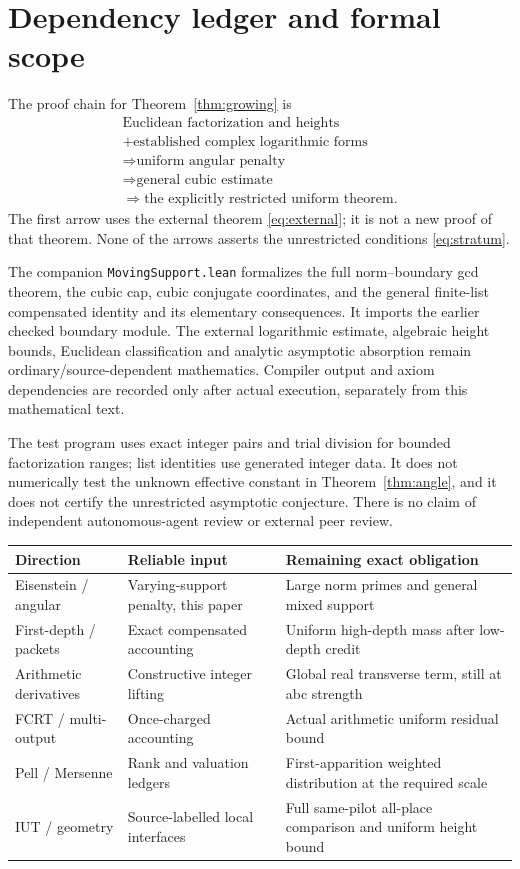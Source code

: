 \documentclass[11pt]{amsart}
\theoremstyle{definition}\newtheorem{definition}[theorem]{Definition}
\theoremstyle{remark}\newtheorem{remark}[theorem]{Remark}
\begin{document}
\section{Dependency ledger and formal scope}
The proof chain for Theorem~\ref{thm:growing} is
\[
 \begin{gathered}
 \text{Euclidean factorization and heights}\\
 +\text{established complex logarithmic forms}\\
 \Longrightarrow\text{uniform angular penalty}\\
 \Longrightarrow\text{general cubic estimate}\\
 \Longrightarrow\text{the explicitly restricted uniform theorem}.
 \end{gathered}
\]
The first arrow uses the external theorem \eqref{eq:external}; it is not a new proof of that theorem. None of the arrows asserts the unrestricted conditions \eqref{eq:stratum}.

The companion \texttt{MovingSupport.lean} formalizes the full norm--boundary gcd theorem, the cubic cap, cubic conjugate coordinates, and the general finite-list compensated identity and its elementary consequences. It imports the earlier checked boundary module. The external logarithmic estimate, algebraic height bounds, Euclidean classification and analytic asymptotic absorption remain ordinary/source-dependent mathematics. Compiler output and axiom dependencies are recorded only after actual execution, separately from this mathematical text.

The test program uses exact integer pairs and trial division for bounded factorization ranges; list identities use generated integer data. It does not numerically test the unknown effective constant in Theorem~\ref{thm:angle}, and it does not certify the unrestricted asymptotic conjecture. There is no claim of independent autonomous-agent review or external peer review.

\begin{center}\small
\begin{tabular}{p{}p{}p{}}
\toprule
Direction & Reliable input & Remaining exact obligation\\\midrule
Eisenstein / angular & Varying-support penalty, this paper & Large norm primes and general mixed support\\
First-depth / packets & Exact compensated accounting & Uniform high-depth mass after low-depth credit\\
Arithmetic derivatives & Constructive integer lifting & Global real transverse term, still at abc strength\\
FCRT / multi-output & Once-charged accounting & Actual arithmetic uniform residual bound\\
Pell / Mersenne & Rank and valuation ledgers & First-apparition weighted distribution at the required scale\\
IUT / geometry & Source-labelled local interfaces & Full same-pilot all-place comparison and uniform height bound\\\bottomrule
\end{tabular}
\end{center}
\end{document}

